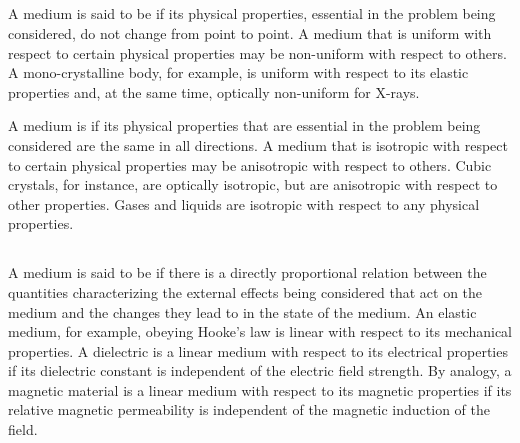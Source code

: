 \subsection{}\label{30.1.6} A medium is said to be  if its physical properties, essential in the problem being considered, do not change from point to point. A medium that is uniform with respect to certain physical properties may be non-uniform with respect to others. A mono-crystalline body, for example, is uniform with respect to its elastic properties and, at the same time, optically non-uniform for X-rays.

A medium is  if its physical properties that are essential in the problem being considered are the same in all directions. A medium that is isotropic with respect to certain physical properties may be anisotropic with respect to others. Cubic crystals, for instance, are optically isotropic, but are anisotropic with respect to other properties. Gases and liquids are isotropic with respect to any physical properties.

\subsection{}\label{30.1.7} A medium is said to be  if there is a directly proportional relation between the quantities characterizing the external effects being considered that act on the medium and the changes they lead to in the state of the medium. An elastic medium, for example, obeying Hooke's law  is linear with respect to its mechanical properties. A dielectric is a linear medium with respect to its electrical properties if its dielectric constant  is independent of the electric field strength. By analogy, a magnetic material is a linear medium with respect to its magnetic properties if its relative magnetic permeability  is independent of the magnetic induction of the field.



